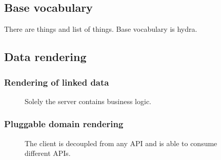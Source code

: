 \subsection{Base vocabulary}\label{basevocab}
There are things and list of things. Base vocabulary is hydra.

\subsection{Data rendering}\label{genericrendering}

\subsubsection{Rendering of linked data}\label{linkeddatarendering}

\begin{figure}[!htb]
  \caption{\label{fig:my-label} Solely the server contains business logic.}
\end{figure}

\subsubsection{Pluggable domain rendering}\label{domainrendering}

\begin{figure}[!htb]
  \caption{\label{fig:my-label} The client is decoupled from any API and is able to consume different APIs.}
\end{figure}

